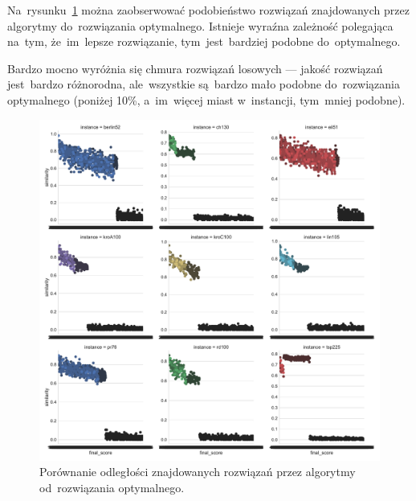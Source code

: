 Na~rysunku~\ref{fig:sim} można zaobserwować podobieństwo rozwiązań znajdowanych przez algorytmy do~rozwiązania optymalnego. Istnieje wyraźna zależność polegająca na~tym, że~im~lepsze rozwiązanie, tym~jest~bardziej podobne do~optymalnego.

Bardzo mocno wyróżnia się chmura rozwiązań losowych --- jakość rozwiązań jest~bardzo różnorodna, ale~wszystkie są~bardzo mało podobne do~rozwiązania optymalnego (poniżej 10\%, a~im~więcej miast w~instancji, tym~mniej podobne).

\begin{figure}[H]
\begin{center}
\includegraphics[width=1.0\textwidth]{graphs/similarity_comparision.pdf}
\end{center}
\caption{Porównanie odległości znajdowanych rozwiązań przez algorytmy od~rozwiązania optymalnego.}
\label{fig:sim}
\end{figure}